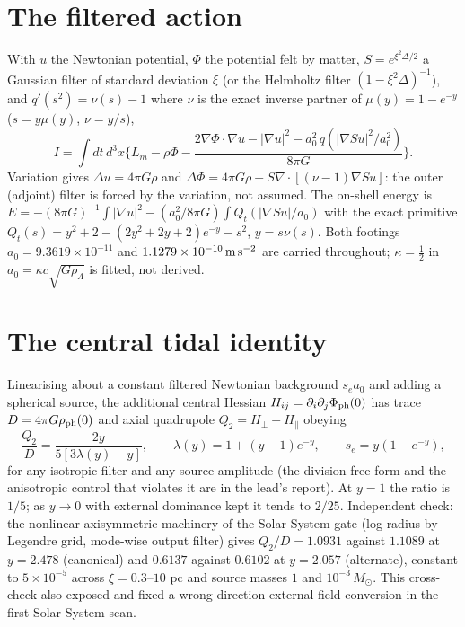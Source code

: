 \documentclass[11pt,letterpaper]{article}
\begin{document}
\section{The filtered action}
With $u$ the Newtonian potential, $\Phi$ the potential felt by matter, $S=e^{\xi^2\Delta/2}$ a Gaussian filter of standard deviation $\xi$ (or the Helmholtz filter $(1-\xi^2\Delta)^{-1}$), and $q'(s^2)=\nu(s)-1$ where $\nu$ is the exact inverse partner of $\mu(y)=1-e^{-y}$ ($s=y\mu(y)$, $\nu=y/s$),
\begin{equation}
I=\int dt\,d^3x\Big\{L_{m}-\rho\Phi-\frac{2\nabla\Phi\cdot\nabla u-|\nabla u|^2-a_0^2\,q(|\nabla Su|^2/a_0^2)}{8\pi G}\Big\}.
\end{equation}
Variation gives $\Delta u=4\pi G\rho$ and $\Delta\Phi=4\pi G\rho+S\nabla\!\cdot\![(\nu-1)\nabla Su]$: the outer (adjoint) filter is forced by the variation, not assumed. The on-shell energy is $E=-(8\pi G)^{-1}\!\int|\nabla u|^2-(a_0^2/8\pi G)\!\int Q_t(|\nabla Su|/a_0)$ with the exact primitive $Q_t(s)=y^2+2-(2y^2+2y+2)e^{-y}-s^2$, $y=s\nu(s)$. Both footings $a_0=9.3619\times10^{-11}$ and $1.1279\times10^{-10}\,{\rm m\,s^{-2}}$ are carried throughout; $\kappa=\tfrac12$ in $a_0=\kappa c\sqrt{G\rho_\Lambda}$ is fitted, not derived.
\section{The central tidal identity}
Linearising about a constant filtered Newtonian background $s_e a_0$ and adding a spherical source, the additional central Hessian $H_{ij}=\partial_i\partial_j\Phi_{\rm ph}(0)$ has trace $D=4\pi G\rho_{\rm ph}(0)$ and axial quadrupole $Q_2=H_\perp-H_\parallel$ obeying
\begin{equation}
\frac{Q_2}{D}=\frac{2y}{5[3\lambda(y)-y]},\qquad \lambda(y)=1+(y-1)e^{-y},\qquad s_e=y(1-e^{-y}),
\end{equation}
for any isotropic filter and any source amplitude (the division-free form and the anisotropic control that violates it are in the lead's report). At $y=1$ the ratio is $1/5$; as $y\to0$ with external dominance kept it tends to $2/25$. Independent check: the nonlinear axisymmetric machinery of the Solar-System gate (log-radius by Legendre grid, mode-wise output filter) gives $Q_2/D=1.0931$ against $1.1089$ at $y=2.478$ (canonical) and $0.6137$ against $0.6102$ at $y=2.057$ (alternate), constant to $5\times10^{-5}$ across $\xi=0.3$--$10$ pc and source masses $1$ and $10^{-3}\,M_\odot$. This cross-check also exposed and fixed a wrong-direction external-field conversion in the first Solar-System scan.
\end{document}
